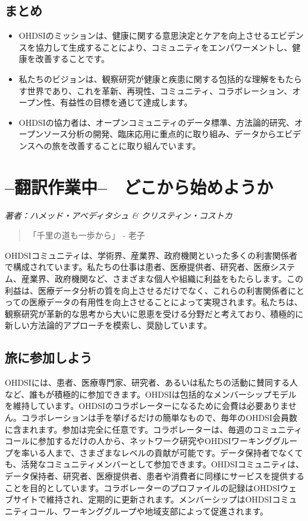\documentclass[
  11pt]{book}
\makeatletter
\newenvironment{kframe}{%
\medskip{}
\setlength{\fboxsep}{.8em}
 \def\at@end@of@kframe{}%
 \ifinner\ifhmode%
  \def\at@end@of@kframe{\end{minipage}}%
  \begin{minipage}{\columnwidth}%
 \fi\fi%
 \def\FrameCommand##1{\hskip\@totalleftmargin \hskip-\fboxsep
 \colorbox{myShadeColor}{##1}\hskip-\fboxsep
     \hskip-\linewidth \hskip-\@totalleftmargin \hskip\columnwidth}%
 \MakeFramed {\advance\hsize-\width
   \@totalleftmargin\z@ \linewidth\hsize
   \@setminipage}}%
 {\par\unskip\endMakeFramed%
 \at@end@of@kframe}
\newenvironment{rmdblock}[1]
  {
  \begin{itemize}
  \renewcommand{\labelitemi}{
    \raisebox{-.7\height}[0pt][0pt]{
      {\setkeys{Gin}{width=3em,keepaspectratio}\texttt{[image: images/\#1]}}
    }
  }
  \setlength{\fboxsep}{1em}
  \begin{kframe}
  \item
  }
  {
  \end{kframe}
  \end{itemize}
  }
\newenvironment{rmdsummary}
  {\begin{rmdblock}{summary}}
  {\end{rmdblock}}
\theoremstyle{definition}
\theoremstyle{definition}
\theoremstyle{definition}
\theoremstyle{definition}
\theoremstyle{remark}
\makeatother
\begin{document}
\section{まとめ}\label{ux307eux3068ux3081}

\begin{rmdsummary}
\begin{itemize}
\item
  OHDSIのミッションは、健康に関する意思決定とケアを向上させるエビデンスを協力して生成することにより、コミュニティをエンパワーメントし、健康を改善することです。
\item
  私たちのビジョンは、観察研究が健康と疾患に関する包括的な理解をもたらす世界であり、これを革新、再現性、コミュニティ、コラボレーション、オープン性、有益性の目標を通じて達成します。
\item
  OHDSIの協力者は、オープンコミュニティのデータ標準、方法論的研究、オープンソース分析の開発、臨床応用に重点的に取り組み、データからエビデンスへの旅を改善することに取り組んでいます。
\end{itemize}
\end{rmdsummary}

\chapter{--翻訳作業中--　どこから始めようか}\label{WhereToBegin}

\emph{著者：ハメッド・アベディタシュ \& クリスティン・コストカ}

\begin{quote}
「千里の道も一歩から」 - 老子
\end{quote}

OHDSIコミュニティは、学術界、産業界、政府機関といった多くの利害関係者で構成されています。私たちの仕事は患者、医療提供者、研究者、医療システム、産業界、政府機関など、さまざまな個人や組織に利益をもたらします。この利益は、医療データ分析の質を向上させるだけでなく、これらの利害関係者にとっての医療データの有用性を向上させることによって実現されます。私たちは、観察研究が革新的な思考から大いに恩恵を受ける分野だと考えており、積極的に新しい方法論的アプローチを模索し、奨励しています。

\section{旅に参加しよう}\label{ux65c5ux306bux53c2ux52a0ux3057ux3088ux3046}

OHDSIには、患者、医療専門家、研究者、あるいは私たちの活動に賛同する人など、誰もが積極的に参加できます。OHDSIは包括的なメンバーシップモデルを維持しています。OHDSIのコラボレーターになるために会費は必要ありません。コラボレーションは手を挙げるだけの簡単なもので、毎年のOHDSI会員数に含まれます。参加は完全に任意です。コラボレーターは、毎週のコミュニティコールに参加するだけの人から、ネットワーク研究やOHDSIワーキンググループを率いる人まで、さまざまなレベルの貢献が可能です。データ保持者でなくても、活発なコミュニティメンバーとして参加できます。OHDSIコミュニティは、データ保持者、研究者、医療提供者、患者や消費者に同様にサービスを提供することを目的としています。コラボレーターのプロファイルの記録はOHDSIウェブサイトで維持され、定期的に更新されます。メンバーシップはOHDSIコミュニティコール、ワーキンググループや地域支部によって促進されます。
\end{document}
